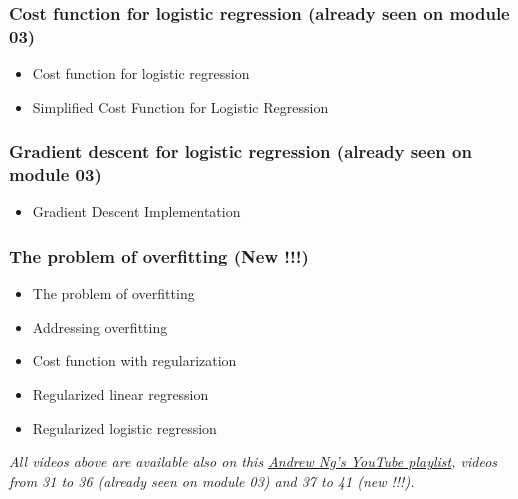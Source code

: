 \subsubsection*{Cost function for logistic regression (already seen on module 03)}
\begin{itemize}
  \item Cost function for logistic regression
  \item Simplified Cost Function for Logistic Regression
\end{itemize}

\subsubsection*{Gradient descent for logistic regression (already seen on module 03)}
\begin{itemize}
  \item Gradient Descent Implementation
\end{itemize}

\subsubsection*{The problem of overfitting (New !!!)}
\begin{itemize}
  \item The problem of overfitting
  \item Addressing overfitting
  \item Cost function with regularization
  \item Regularized linear regression
  \item Regularized logistic regression  
\end{itemize}


\emph{All videos above are available also on this \href{https://youtube.com/playlist?list=PLkDaE6sCZn6FNC6YRfRQc_FbeQrF8BwGI&feature=shared}{Andrew Ng's YouTube playlist}, videos from 31 to 36 (already seen on module 03) and 37 to 41 (new !!!).}